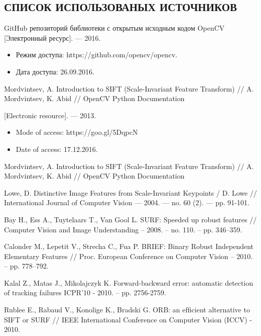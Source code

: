 \begin{center}
    \section*{СПИСОК ИСПОЛЬЗОВАНЫХ ИСТОЧНИКОВ}
\end{center}

\begin{enumerate}
    \item \label{itm:opencv} {GitHub репозиторий библиотеки с открытым исходным кодом OpenCV [Электронный ресурс]. — 2016.
    \begin{itemize}
        \item Режим доступа: https://github.com/opencv/opencv.
        \item Дата доступа: 26.09.2016.
    \end{itemize}
    
    \item \label{opencv-sift} Mordvintsev, A. Introduction to SIFT (Scale-Invariant Feature Transform) // A. Mordvintsev, K. Abid // OpenCV Python Documentation
    
    [Electronic resource]. — 2013. 
    \begin{itemize} 
        \item Mode of access: https://goo.gl/5DqpcN
        \item Date of access: 17.12.2016.
    \end{itemize}}
    
    \item \label{itm:opencv-sift} Mordvintsev, A. Introduction to SIFT (Scale-Invariant Feature Transform) // A. Mordvintsev, K. Abid // OpenCV Python Documentation
    
    \item \label{itm:lowe} Lowe, D. Distinctive Image Features from Scale-Invariant Keypoints / D. Lowe // International Journal of Computer Vision — 2004. — no. 60 (2). — pp. 91-101.
    
    \item \label{itm:surf} Bay H., Ess A., Tuytelaars T., Van Gool L. SURF: Speeded up robust features // Computer Vision and Image Understanding – 2008. – no. 110. – pp. 346–359.
    
    \item \label{itm:brief} Calonder M., Lepetit V., Strecha C., Fua P. BRIEF: Binary Robust Independent Elementary Features // Proc. European Conference on Computer Vision – 2010. – pp. 778–792.
    
    \item \label{itm:gloh} Kalal Z., Matas J., Mikolajczyk K. Forward-backward error: automatic detection of tracking failures ICPR’10 - 2010. – pp. 2756-2759.
    
    \item \label{itm:orb} Rublee E., Rabaud V., Konolige K., Bradski G. ORB: an efﬁcient alternative to SIFT or SURF // IEEE International Conference on Computer Vision (ICCV) - 2010.
\end{enumerate}

\newpage